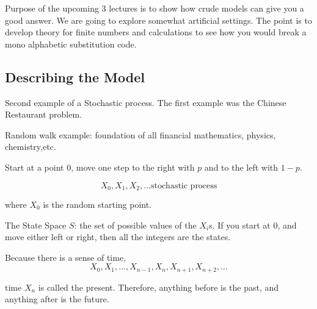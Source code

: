 \documentclass{report}
\begin{document}
Purpose of the upcoming 3 lectures is to show how crude models can give you a good answer. We are going to explore somewhat artificial settings. The point is to develop theory for finite numbers and calculations to see how you would break a mono alphabetic substitution code. 

\subsection{Describing the Model}
Second example of a Stochastic process. The first example was the Chinese Restaurant problem. 

Random walk example: foundation of all financial mathematics, physics, chemistry,etc. 

Start at a point 0, move one step to the right with $ p $ and to the left with $ 1-p $. 


\[
X_0, X_1, X_2, \dots \text{stochastic process}
\]

where $ X_0 $ is the random starting point. 

The State Space $ S $: the set of possible values of the $ X_{i} $s. If you start at 0, and move either left or right, then all the integers are the states.  

Because there is a sense of time, 
\[
X_0, X_1, \dots, X_{n-1}, X_{n}, X_{n+1}, X_{n+2}, \dots
\]

time $ X_{n} $ is called the present. Therefore, anything before is the past, and anything after is the future.  


\end{document}
